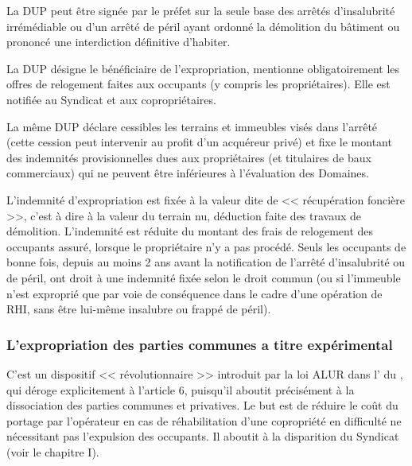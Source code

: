		La DUP peut être signée par le préfet sur la seule base des arrêtés d'insalubrité irrémédiable ou d'un arrêté
		de péril ayant ordonné la démolition du bâtiment ou prononcé une interdiction définitive d'habiter.
		
		La DUP désigne le bénéficiaire de l'expropriation, mentionne obligatoirement les offres de relogement
		faites aux occupants (y compris les propriétaires). Elle est notifiée au Syndicat et aux copropriétaires.
		
		La même DUP déclare cessibles les terrains et immeubles visés dans l'arrêté (cette cession peut intervenir
		au profit d’un acquéreur privé) et fixe le montant des indemnités provisionnelles dues aux propriétaires
		(et titulaires de baux commerciaux) qui ne peuvent être inférieures à l'évaluation des Domaines.
		
		L’indemnité d’expropriation est fixée à la valeur dite de << récupération foncière >>, c’est à dire à la valeur du
		terrain nu, déduction faite des travaux de démolition. L’indemnité est réduite du montant des frais de
		relogement des occupants assuré, lorsque le propriétaire n'y a pas procédé. Seuls les occupants de bonne
		fois, depuis au moins 2 ans avant la notification de l'arrêté d’insalubrité ou de péril, ont droit à une
		indemnité fixée selon le droit commun (ou si l’immeuble n’est exproprié que par voie de conséquence
		dans le cadre d’une opération de RHI, sans être lui-même insalubre ou frappé de péril).
		
		\subsubsection{L’expropriation des parties communes a titre expérimental}

		C’est un dispositif << révolutionnaire >> introduit par la loi ALUR dans l’ du \CCH, qui déroge
		explicitement à l’article 6, puisqu'il aboutit précisément à la dissociation des parties communes et
		privatives. Le but est de réduire le coût du portage par l’opérateur en cas de réhabilitation d’une
		copropriété en difficulté ne nécessitant pas l’expulsion des occupants. Il aboutit à la disparition du Syndicat
		(voir le chapitre I).
		
